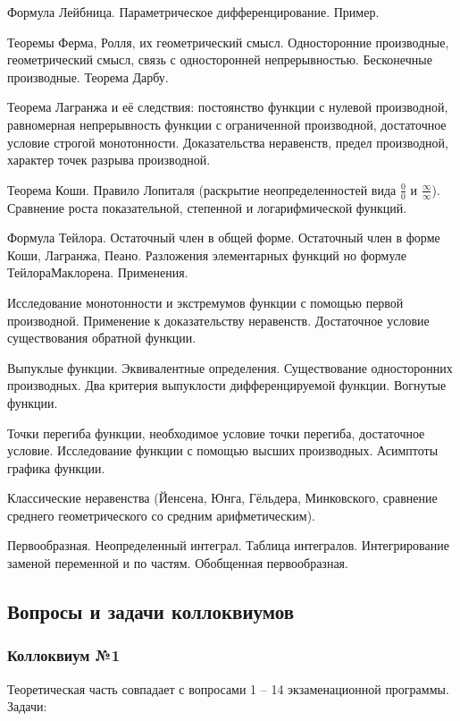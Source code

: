 \documentclass[a4paper]{article}
\begin{document}
\begin{nums}{-2}
Формула Лейбница. Параметрическое дифференцирование. Пример.
\item Теоремы Ферма, Ролля, их геометрический смысл. Односторонние производные, геометрический смысл, связь с
односторонней непрерывностью. Бесконечные производные. Теорема Дарбу.
\item Теорема Лагранжа и её следствия: постоянство функции с нулевой производной, равномерная непрерывность функции
с ограниченной производной, достаточное условие строгой монотонности. Доказательства неравенств, предел производной,
характер точек разрыва производной.
\item Теорема Коши. Правило Лопиталя (раскрытие неопределенностей вида $\frac{0}{0}$ и $\frac{\infty}{\infty}$).
Сравнение роста показательной, степенной и логарифмической функций.
\item Формула Тейлора. Остаточный член в общей форме. Остаточный член в форме Коши, Лагранжа, Пеано. Разложения
элементарных функций но формуле Тейлора\ч Маклорена. Применения.
\item Исследование монотонности и экстремумов функции с помощью первой производной. Применение к доказательству
неравенств. Достаточное условие существования обратной функции.
\item Выпуклые функции. Эквивалентные определения. Существование односторонних производных. Два критерия выпуклости
дифференцируемой функции. Вогнутые функции.
\item Точки перегиба функции, необходимое условие точки перегиба, достаточное условие. Исследование функции
с помощью высших производных. Асимптоты графика функции.
\item Классические неравенства (Йенсена, Юнга, Гёльдера, Минковского, сравнение среднего геометрического
со средним арифметическим).
\item Первообразная. Неопределенный интеграл. Таблица интегралов. Интегрирование заменой переменной и по частям.
Обобщенная первообразная.
\end{nums}

\subsection{Вопросы и задачи коллоквиумов}

\subsubsection{Коллоквиум №1}

Теоретическая часть совпадает с вопросами 1 -- 14 экзаменационной программы. Задачи:
\end{document}
